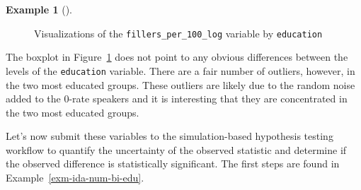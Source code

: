\documentclass[
  letterpaper,
]{latex/krantz}
\theoremstyle{definition}
\newtheorem{example}{Example}[chapter]
\theoremstyle{remark}
\begin{document}
\begin{example}[]
\begin{figure}[H]
{}

\caption{\label{fig-ida-num-bi-edu-vis}Visualizations of the
\texttt{fillers\_per\_100\_log} variable by \texttt{education}}

\end{figure}%

\end{example}

The boxplot in Figure~\ref{fig-ida-num-bi-edu-vis} does not point to any
obvious differences between the levels of the \texttt{education}
variable. There are a fair number of outliers, however, in the two most
educated groups. These outliers are likely due to the random noise added
to the 0-rate speakers and it is interesting that they are concentrated
in the two most educated groups.

Let's now submit these variables to the simulation-based hypothesis
testing workflow to quantify the uncertainty of the observed statistic
and determine if the observed difference is statistically significant.
The first steps are found in Example~\ref{exm-ida-num-bi-edu}.
\end{document}
